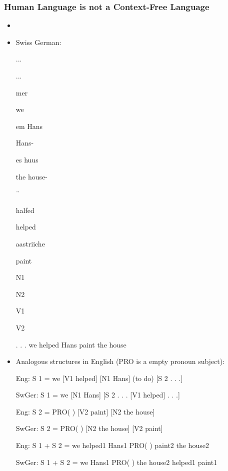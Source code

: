 \documentclass[compress,color=usenames]{beamer}
\begin{document}
\begin{frame}
\frametitle{Human Language is not a Context-Free Language}

\begin{itemize}
\item



\item Swiss German:


...


...





mer


we





em Hans


Hans-





es huus


the house-





¨


halfed


helped





aastriiche


paint





N1


N2


V1


V2


. . . we helped Hans paint the house


\item Analogous structures in English (PRO is a empty pronoun subject):


Eng: S 1 = we [V1 helped] [N1 Hans] (to do) [S 2 . . .]


SwGer: S 1 = we [N1 Hans] [S 2 . . . [V1 helped] . . .]


Eng: S 2 = PRO( ) [V2 paint] [N2 the house]


SwGer: S 2 = PRO( ) [N2 the house] [V2 paint]


Eng: S 1 + S 2 = we helped1 Hans1 PRO( ) paint2 the house2


SwGer: S 1 + S 2 = we Hans1 PRO( ) the house2 helped1 paint1



\end{itemize}

\end{frame}
\end{document}

